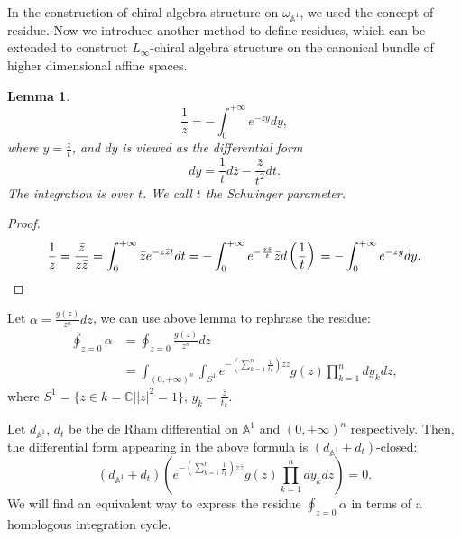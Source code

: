 \documentclass[11pt]{amsart}
\newtheorem{lem}[thm]{Lemma}
\theoremstyle{definition}
\theoremstyle{remark}
\numberwithin{equation}{section}
\renewcommand{\AA}{\mathbb{A}}
\begin{document}
In the construction of chiral algebra structure on $\omega_{\mathbb{A}^{1}}$, we used the concept of residue. Now we introduce another method to define residues, which can be extended to construct $L_{\infty}$-chiral algebra structure on the canonical bundle of higher dimensional affine spaces.
\begin{lem}
    $$
    \frac{1}{z}=-\int_{0}^{+\infty}e^{-zy}dy,
    $$
    where $y=\frac{\bar{z}}{t}$, and $dy$ is viewed as the differential form $$dy=\frac{1}{t} d\bar{z}-\frac{\bar{z}}{t^2} d t.$$
    The integration is over $t$. We call $t$ the Schwinger parameter.
\end{lem}
\begin{proof}
  \begin{equation}
        \frac{1}{z} =\frac{\bar{z}}{z\bar{z}}\\
    =
\int_{0}^{+\infty}\bar{z}e^{-z\bar{z}t}dt\\
        =
        -\int_{0}^{+\infty}e^{-\frac{z\bar{z}}{t}}\bar{z}d\left(\frac{1}{t}\right)\\
        =
-\int_{0}^{+\infty}e^{-zy}dy.
\end{equation}
\end{proof}

Let $\alpha=\frac{g(z)}{z^{n}}dz$, we can use above lemma to rephrase the residue:
\begin{align*}
\oint_{z=0}\alpha 
&=
\oint_{z=0}\frac{g(z)}{z^{n}}dz \\
&=
\int_{(0,+\infty)^{n}}\int_{S^{1}}e^{-\left(\sum_{k=1}^{n}\frac{1}{t_{k}}\right)z\bar{z}}g(z)\prod_{k=1}^{n}dy_{k}dz,
\end{align*}
where $S^{1}=\{z\in k=\mathbb{C}||z|^2=1\}$, $y_{k}=\frac{\bar{z}}{t_{k}}$.

Let $d_{\mathbb{A}^{1}}$, $d_{t}$ be the de Rham differential on $\mathbb{A}^{1}$ and $(0,+\infty)^{n}$ respectively.
Then, the differential form appearing in the above formula is $(d_{\AA^{1}} + d_{t})$-closed:
$$
(d_{\mathbb{A}^{1}}+d_{t}) \left(e^{-\left(\sum_{k=1}^{n}\frac{1}{t_{k}}\right)z\bar{z}}g(z)\prod_{k=1}^{n}dy_{k}dz\right)=0.
$$
We will find an equivalent way to express the residue $\oint_{z=0} \alpha$ in terms of a homologous integration cycle.
\end{document}
